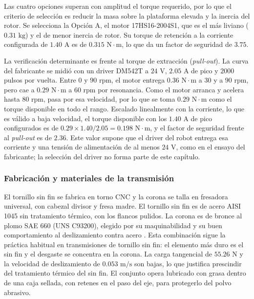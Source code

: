 \documentclass[../../General.tex]{subfiles}
\begin{document}
Las cuatro opciones superan con amplitud el torque requerido, por lo que el criterio de selección es reducir la masa sobre la plataforma elevada y la inercia del rotor. Se selecciona la Opción A, el motor 17HS16-2004S1, que es el más liviano ($0.31\text{ kg}$) y el de menor inercia de rotor. Su torque de retención a la corriente configurada de $1.40\text{ A}$ es de $0.315\text{ N}\cdot\text{m}$, lo que da un factor de seguridad de $3.75$.

La verificación determinante es frente al torque de extracción (\textit{pull-out}). La curva del fabricante \citep{stepperonline_17hs16} se midió con un driver DM542T a $24\text{ V}$, $2.05\text{ A}$ de pico y $2000$ pulsos por vuelta. Entre $0$ y $90\text{ rpm}$, el motor entrega $0.36\text{ N}\cdot\text{m}$ a $30$ y a $90\text{ rpm}$, pero cae a $0.29\text{ N}\cdot\text{m}$ a $60\text{ rpm}$ por resonancia. Como el motor arranca y acelera hasta $80\text{ rpm}$, pasa por esa velocidad, por lo que se toma $0.29\text{ N}\cdot\text{m}$ como el torque disponible en todo el rango. Escalado linealmente con la corriente, lo que es válido a baja velocidad, el torque disponible con los $1.40\text{ A}$ de pico configurados es de $0.29 \times 1.40/2.05 = 0.198\text{ N}\cdot\text{m}$, y el factor de seguridad frente al \textit{pull-out} es de $2.36$. Este valor supone que el driver del robot entrega esa corriente y una tensión de alimentación de al menos $24\text{ V}$, como en el ensayo del fabricante; la selección del driver no forma parte de este capítulo.

\subsubsection{Fabricación y materiales de la transmisión}

El tornillo sin fin se fabrica en torno CNC y la corona se talla en fresadora universal, con cabezal divisor y fresa madre. El tornillo sin fin es de acero AISI 1045 sin tratamiento térmico, con los flancos pulidos. La corona es de bronce al plomo SAE 660 (UNS C93200), elegido por su maquinabilidad y su buen comportamiento al deslizamiento contra acero \citep{asm1990nonferrous}. Esta combinación sigue la práctica habitual en transmisiones de tornillo sin fin: el elemento más duro es el sin fin y el desgaste se concentra en la corona. La carga tangencial de $55.26\text{ N}$ y la velocidad de deslizamiento de $0.053\text{ m/s}$ son bajas, lo que justifica prescindir del tratamiento térmico del sin fin. El conjunto opera lubricado con grasa dentro de una caja sellada, con retenes en el paso del eje, para protegerlo del polvo abrasivo.
\end{document}
